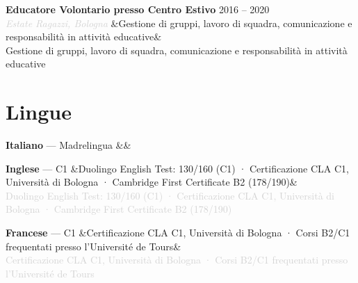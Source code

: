 \documentclass[a4paper,10pt]{article}
\newcommand{\entry}[4]{%
  \noindent\textbf{#1} \hfill \textcolor{accent}{#2}\\
  \textit{\textcolor{lightgray}{#3}}%
  \ifx&#4&\else\\\vspace{0.2em}#4\fi
  \vspace{0.5em}
}
\newcommand{\langentry}[3]{%
  \noindent\textbf{#1} — #2%
  \ifx&#3&\else\\\textcolor{lightgray}{\small #3}\fi
  \vspace{0.4em}
}
\begin{document}
\entry{Educatore Volontario presso Centro Estivo}{2016 -- 2020}{Estate Ragazzi, Bologna}
{Gestione di gruppi, lavoro di squadra, comunicazione e responsabilità in attività educative}

\section{Lingue}

\langentry{Italiano}{Madrelingua}{}

\langentry{Inglese}{C1}
  {Duolingo English Test: 130/160 (C1) · Certificazione CLA C1, Università di Bologna · Cambridge First Certificate B2 (178/190)}

\langentry{Francese}{C1}
  {Certificazione CLA C1, Università di Bologna · Corsi B2/C1 frequentati presso l’Université de Tours}
\end{document}
